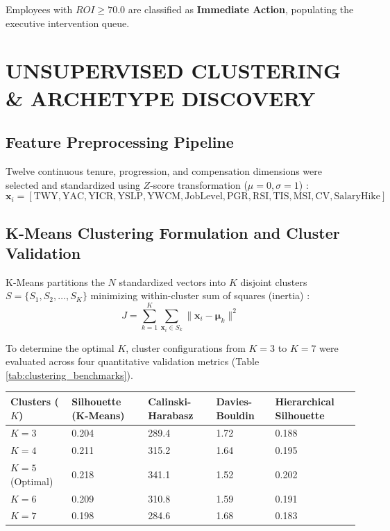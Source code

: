 \documentclass[12pt,a4paper,oneside]{report}
\begin{document}
Employees with $ROI \ge 70.0$ are classified as \textbf{Immediate Action}, populating the executive intervention queue.

\clearpage
\chapter{UNSUPERVISED CLUSTERING \& ARCHETYPE DISCOVERY}

\section{Feature Preprocessing Pipeline}
Twelve continuous tenure, progression, and compensation dimensions were selected and standardized using $Z$-score transformation ($\mu = 0, \sigma = 1$) \cite{ref_pedregosa_sklearn}:
\begin{equation}
\mathbf{x}_i = [\text{TWY}, \text{YAC}, \text{YICR}, \text{YSLP}, \text{YWCM}, \text{JobLevel}, \text{PGR}, \text{RSI}, \text{TIS}, \text{MSI}, \text{CV}, \text{SalaryHike}]
\end{equation}

\section{K-Means Clustering Formulation and Cluster Validation}
K-Means partitions the $N$ standardized vectors into $K$ disjoint clusters $S = \{S_1, S_2, \dots, S_K\}$ minimizing within-cluster sum of squares (inertia) \cite{ref_macqueen_kmeans}:
\begin{equation}
J = \sum_{k=1}^{K} \sum_{\mathbf{x}_i \in S_k} \|\mathbf{x}_i - \boldsymbol{\mu}_k\|^2
\end{equation}

To determine the optimal $K$, cluster configurations from $K=3$ to $K=7$ were evaluated across four quantitative validation metrics (Table \ref{tab:clustering_benchmarks}).

\begin{center}
\begin{tabular}{|C{2.2cm}|C{3.2cm}|C{3.4cm}|C{3.0cm}|C{3.6cm}|}
\hline
\textbf{Clusters ($K$)} & \textbf{Silhouette (K-Means)} & \textbf{Calinski-Harabasz} & \textbf{Davies-Bouldin} & \textbf{Hierarchical Silhouette} \\ \hline
$K=3$ & 0.204 & 289.4 & 1.72 & 0.188 \\ \hline
$K=4$ & 0.211 & 315.2 & 1.64 & 0.195 \\ \hline
$K=5$ (Optimal) & 0.218 & 341.1 & 1.52 & 0.202 \\ \hline
$K=6$ & 0.209 & 310.8 & 1.59 & 0.191 \\ \hline
$K=7$ & 0.198 & 284.6 & 1.68 & 0.183 \\ \hline
\end{tabular}
\vspace{0.05in}
\label{tab:clustering_benchmarks}
\end{center}
\end{document}
